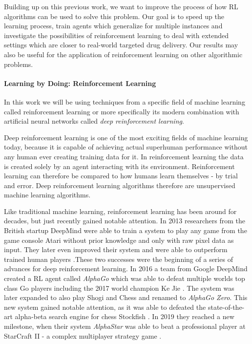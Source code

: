  Building up on this previous work, we want to improve the process of how RL algorithms can be used to solve this problem. Our goal is to speed up the learning process, train agents which generalize for multiple instances and investigate the possibilities of reinforcement learning to deal with extended settings which are closer to real-world targeted drug delivery. Our results may also be useful for the application of reinforcement learning on other algorithmic problems.

 \paragraph{Learning by Doing: Reinforcement Learning} 
In this work we will be using techniques from a specific field of machine learning called reinforcement learning or more specifically its modern combination with artificial neural networks called \textit{deep reinforcement learning}.

 Deep reinforcement learning is one of the most exciting fields of machine learning today, because it is capable of achieving actual superhuman performance without any human ever creating training data for it. In reinforcement learning the data is created solely by an agent interacting with its environment. Reinforcement learning can therefore be compared to how humans learn themselves - by trial and error. Deep reinforcement learning algorithms therefore are unsupervised machine learning algorithms.

 Like traditional machine learning, reinforcement learning has been around for decades, but just recently gained notable attention. In 2013 researchers from the British startup DeepMind were able to train a system to play any game from the game console Atari without prior knowledge and only with raw pixel data as input. \cite{mnih2013playing} They later even improved their system and were able to outperform trained human players \cite{mnih2015human}.These two successes were the beginning of a series of advances for deep reinforcement learning. In 2016 a team from Google DeepMind created a RL agent called \textit{AlphaGo} which was able to defeat multiple worlds top class Go players including the 2017 world champion Ke Jie \cite{borowiec2016alphago}. The system was later expanded to also play Shogi and Chess and renamed to \textit{AlphaGo Zero}. This new system gained notable attention, as it was able to defeated the state-of-the-art alpha-beta search engine for chess Stockfish \cite{silver2017mastering}. In 2019 they reached a new milestone, when their system \textit{AlphaStar} was able to beat a professional player at StarCraft II - a complex multiplayer strategy game \cite{arulkumaran2019alphastar}. 

